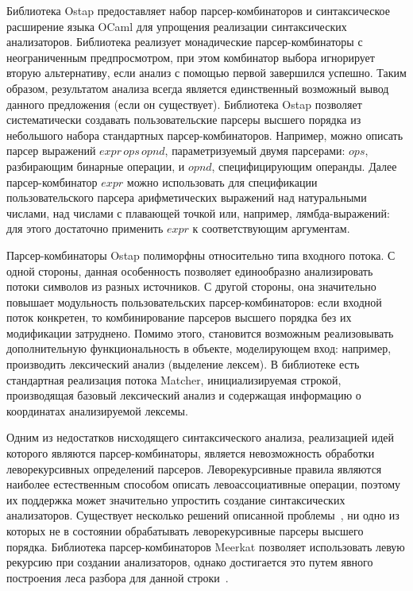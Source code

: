 \documentclass [a4paper] {article}
\begin{document}
Библиотека Ostap предоставляет набор парсер-комбинаторов и синтаксическое расширение языка OCaml для упрощения реализации синтаксических анализаторов. Библиотека реализует монадические парсер-комбинаторы с неограниченным предпросмотром, при этом комбинатор выбора игнорирует вторую альтернативу, если анализ с помощью первой завершился успешно. Таким образом, результатом анализа всегда является единственный возможный вывод данного предложения (если он существует). Библиотека Ostap позволяет систематически создавать пользовательские парсеры высшего порядка из небольшого набора стандартных парсер-комбинаторов. Например, можно описать парсер выражений $expr \, ops \, opnd$, параметризуемый двумя парсерами: $ops$, разбирающим бинарные операции, и $opnd$, специфицирующим операнды. Далее парсер-комбинатор $expr$ можно использовать для спецификации пользовательского парсера арифметических выражений над натуральными числами, над числами с плавающей точкой или, например, лямбда-выражений: для этого достаточно применить $expr$ к соответствующим аргументам. 

Парсер-комбинаторы Ostap полиморфны относительно типа входного потока. С одной стороны, данная особенность позволяет единообразно анализировать потоки символов из разных источников. С другой стороны, она значительно повышает модульность пользовательских парсер-комбинаторов: если входной поток конкретен, то комбинирование парсеров высшего порядка без их модификации затруднено. Помимо этого, становится возможным реализовывать дополнительную функциональность в объекте, моделирующем вход: например, производить лексический анализ (выделение лексем). В библиотеке есть стандартная реализация потока Matcher, инициализируемая строкой, производящая базовый лексический анализ и содержащая информацию о координатах анализируемой лексемы. 

Одним из недостатков нисходящего синтаксического анализа, реализацией идей которого являются парсер-комбинаторы, является невозможность обработки леворекурсивных определений парсеров. Леворекурсивные правила являются наиболее естественным способом описать левоассоциативные операции, поэтому их поддержка может значительно упростить создание синтаксических анализаторов. Существует несколько решений описанной проблемы~\cite{frost2008parser, warth2008packrat}, ни одно из которых не в состоянии обрабатывать леворекурсивные парсеры высшего порядка. Библиотека парсер-комбинаторов Meerkat позволяет использовать левую рекурсию при создании анализаторов, однако достигается это путем явного построения леса разбора для данной строки~\cite{Izmaylova}.
\end{document}
